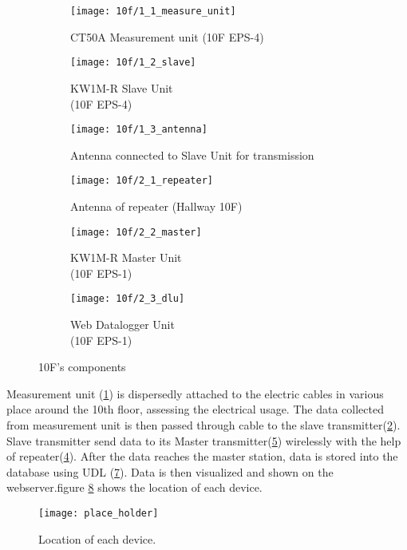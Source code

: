 \begin{figure}[h]
    \centering
    \begin{subfigure}[b]{0.3\textwidth}
        \centering
        \texttt{[image: 10f/1\_1\_measure\_unit]}
        \caption{\small CT50A Measurement unit (10F EPS-4)}
        \label{fig:s4_measure}
    \end{subfigure}
    \hfill
    \begin{subfigure}[b]{0.3\textwidth}
        \centering
        \texttt{[image: 10f/1\_2\_slave]}
        \caption{\small KW1M-R Slave Unit \\ (10F EPS-4)}
        \label{fig:s4_slave}
    \end{subfigure}
    \hfill
    \begin{subfigure}[b]{0.3\textwidth}
        \centering
        \texttt{[image: 10f/1\_3\_antenna]}
        \caption{\small Antenna connected to Slave Unit for transmission}
        \label{fig:s4_antenna}
    \end{subfigure}

    \begin{subfigure}[b]{0.3\textwidth}
        \centering
        \texttt{[image: 10f/2\_1\_repeater]}
        \caption{Antenna of repeater (Hallway 10F)}
        \label{fig:s4_repeater}
    \end{subfigure}
    \hfill
    \begin{subfigure}[b]{0.3\textwidth}
        \centering
        \texttt{[image: 10f/2\_2\_master]}
        \caption{KW1M-R Master Unit \\ (10F EPS-1)}
        \label{fig:s4_master}
    \end{subfigure}
    \hfill
    \begin{subfigure}[b]{0.3\textwidth}
        \centering
        \texttt{[image: 10f/2\_3\_dlu]}
        \caption{Web Datalogger Unit \\(10F EPS-1) }
        \label{fig:s4_dlu}
    \end{subfigure}

    \caption{10F's components}
\end{figure}


Measurement unit (\ref{fig:s4_measure}) is dispersedly attached to the electric cables in various place around the 10th floor, assessing the electrical usage. 
The data collected from measurement unit is then passed through cable to the slave transmitter(\ref{fig:s4_slave}). 
Slave transmitter send data to its Master transmitter(\ref{fig:s4_master}) wirelessly with the help of repeater(\ref{fig:s4_repeater}). 
After the data reaches the master station, data is stored into the database using UDL (\ref{fig:s4_dlu}). 
Data is then visualized and shown on the webserver.figure \ref{fig:s4_location} shows the location of each device.

\begin{figure}[H]
    \centering
    \texttt{[image: place\_holder]}
    \caption{Location of each device.}
    \label{fig:s4_location}
\end{figure} 
